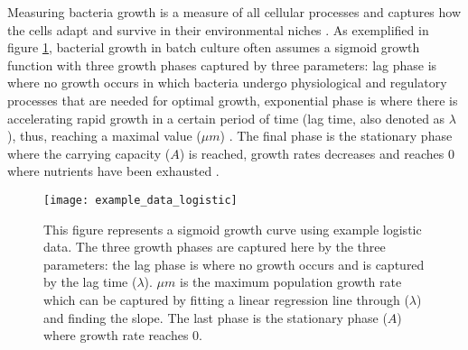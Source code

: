 \documentclass[11pt]{article}
\begin{document}
Measuring bacteria growth is a measure of all cellular processes and captures how the cells adapt and 
survive in their environmental niches \cite{tonner_bayesian_2020}. As exemplified in figure \ref{fig:mesh1}, bacterial growth in batch culture often assumes a sigmoid growth 
function with three growth phases captured by three parameters: lag phase is where no growth occurs in which 
bacteria undergo physiological and regulatory processes that are needed for optimal growth, exponential
phase is where there is accelerating rapid growth in a certain period of time (lag time, also denoted as $\lambda$),
thus, reaching a maximal value ($\mu m$) \cite{rolfe_lag_2012}. The final phase is the stationary phase where the carrying capacity ($A$) is reached, 
growth rates decreases and reaches 0 where nutrients have been exhausted \cite{tonner_detecting_2017,zwietering_modeling_1990}.  

    \begin{figure}[H]
    \centering
    \texttt{[image: example\_data\_logistic]}
    \caption{This figure represents a sigmoid growth curve using example logistic data. The three growth phases are captured here by the three parameters: the lag phase is where no growth occurs and is captured by the lag time ($\lambda$).
    $\mu m$ is the maximum population growth rate which can be captured by fitting a linear regression line through ($\lambda$) and finding the slope. The last phase is the stationary phase ($A$) where growth rate reaches 0.}
    \label{fig:mesh1}
    \end{figure}
\end{document}
